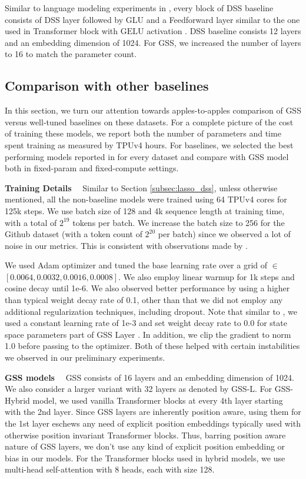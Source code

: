 Similar to language modeling experiments in \citep{gu2022efficiently}, every block of DSS baseline consists of DSS layer followed by GLU \citep{glu_dauphin2016language} and a Feedforward layer similar to the one used in Transformer block with $\mathrm{GELU}$  activation \citep{Hendrycks2016BridgingNA}. DSS baseline consists 12 layers and an embedding dimension of 1024. For GSS, we increased the number of layers to 16 to match the parameter count.

\subsection{Comparison with other baselines}

In this section, we turn our attention towards apples-to-apples comparison of GSS versus well-tuned baselines on these datasets. For a complete picture of the cost of training these models, we report both the number of parameters and time spent training as measured by TPUv4 hours. For baselines, we selected the best performing models reported in \citep{hutchins2022block} for every dataset and compare with GSS model both in fixed-param and fixed-compute settings. 

\textbf{Training Details} \ \ Similar to Section \ref{subsec:lasso_dss}, unless otherwise mentioned, all the non-baseline models were trained using 64 TPUv4 cores for 125k steps. We use batch size of 128 and 4k sequence length at training time, with a total of $2^{19}$ tokens per batch. We increase the batch size to 256 for the Github dataset (with a token count of $2^{20}$ per batch) since we observed a lot of noise in our metrics. This is consistent with observations made by \cite{hutchins2022block}. 

We used Adam optimizer \citep{kingma2014adam} and tuned the base learning rate over a grid of $\in$ $[0.0064, 0.0032, 0.0016, 0.0008]$. We also employ linear warmup for 1k steps and cosine decay until 1e-6. We also observed better performance by using a higher than typical weight decay rate of 0.1, other than that we did not employ any additional regularization techniques, including dropout. Note that similar to \citep{gu2022efficiently,dss_gupta2022diagonal}, we used a constant learning rate of 1e-3 and set weight decay rate to 0.0 for state space parameters part of GSS Layer . In addition, we clip the gradient to norm 1.0 before passing to the optimizer. Both of these helped with certain instabilities we observed in our preliminary experiments. 

\textbf{GSS models} \ \ GSS consists of 16 layers and an embedding dimension of 1024. We also consider a larger variant with 32 layers as denoted by GSS-L. For GSS-Hybrid model, we used vanilla Transformer blocks at every 4th layer starting with the 2nd layer. Since GSS layers are inherently position aware, using them for the 1st layer eschews any need of explicit position embeddings typically used with otherwise position invariant Transformer blocks. Thus, barring position aware nature of GSS layers, we don't use any kind of explicit position embedding or bias in our models. For the Transformer blocks used in hybrid models, we use multi-head self-attention with 8 heads, each with size 128. 

